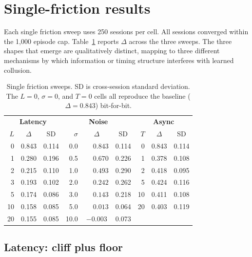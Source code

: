 \section{Single-friction results}
\label{sec:results-singles}

Each single friction sweep uses 250 sessions per cell. All sessions converged within the 1{,}000 episode cap. Table~\ref{tab:singles} reports $\Delta$ across the three sweeps. The three shapes that emerge are qualitatively distinct, mapping to three different mechanisms by which information or timing structure interferes with learned collusion.

\begin{table}[H]
\centering
\caption{Single friction sweeps. SD is cross-session standard deviation. The $L=0$, $\sigma=0$, and $T=0$ cells all reproduce the baseline ($\Delta=0.843$) bit-for-bit.}
\label{tab:singles}
\begin{tabular}{rcc@{\hspace{0.75em}}|@{\hspace{0.75em}}rcc@{\hspace{0.75em}}|@{\hspace{0.75em}}rcc}
\toprule
\multicolumn{3}{c}{\textbf{Latency}} & \multicolumn{3}{c}{\textbf{Noise}} & \multicolumn{3}{c}{\textbf{Async}} \\
$L$ & $\Delta$ & SD & $\sigma$ & $\Delta$ & SD & $T$ & $\Delta$ & SD \\
\midrule
0  & 0.843 & 0.114 & 0.0  & $\phantom{-}0.843$ & 0.114 & 0  & 0.843 & 0.114 \\
1  & 0.280 & 0.196 & 0.5  & $\phantom{-}0.670$ & 0.226 & 1  & 0.378 & 0.108 \\
2  & 0.215 & 0.110 & 1.0  & $\phantom{-}0.493$ & 0.290 & 2  & 0.418 & 0.095 \\
3  & 0.193 & 0.102 & 2.0  & $\phantom{-}0.242$ & 0.262 & 5  & 0.424 & 0.116 \\
5  & 0.174 & 0.086 & 3.0  & $\phantom{-}0.143$ & 0.218 & 10 & 0.411 & 0.108 \\
10 & 0.158 & 0.085 & 5.0  & $\phantom{-}0.013$ & 0.064 & 20 & 0.403 & 0.119 \\
20 & 0.155 & 0.085 & 10.0 & $-0.003$           & 0.073 &    &       &       \\
\bottomrule
\end{tabular}
\end{table}

\subsection{Latency: cliff plus floor}
\label{sec:results-latency}

